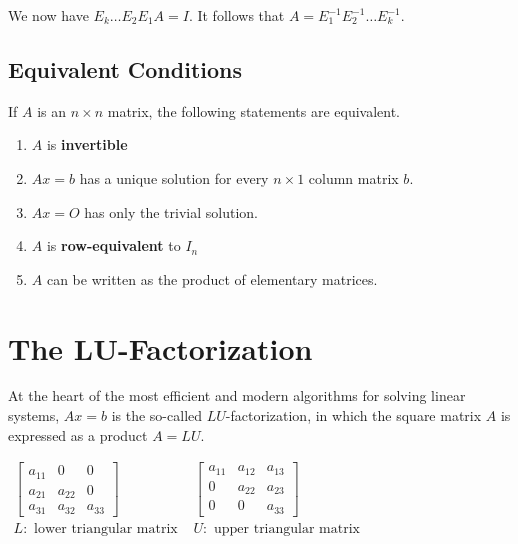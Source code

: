 \documentclass{article}
\newcommand\B{\textbf}
\newcommand\x{\times}
\begin{document}
    We now have $E_k \dots E_2E_1A = I$. It follows that $A = E_1^{-1}E_2^{-1}\dots E_k^{-1}$.

    \subsection*{\textcolor{blue3}{Equivalent Conditions}}

    \begin{center}
    \begin{tcolorbox}
           If $A$ is an $n \x n$ matrix, the following statements are equivalent.
           \begin{enumerate}
               \item $A$ is \B{invertible}
               \item $Ax = b$ has a unique solution for every $n \x 1$ column matrix $b$.
               \item $Ax = O$ has only the trivial solution.
               \item $A$ is \B{row-equivalent} to $I_n$
               \item $A$ can be written as the product of elementary matrices.
           \end{enumerate}
    \end{tcolorbox}
    
    \end{center}

    \section{The LU-Factorization}
    
    At the heart of the most efficient and modern algorithms for solving linear systems,
    $Ax = b$ is the so-called $LU$-factorization, in which the square matrix $A$ is expressed as
    a product $A = LU$.

    $ \begin{array}{cc}
        \begin{bmatrix}
            a_{11} & 0 & 0 \\
            a_{21} & a_{22} & 0 \\
            a_{31} & a_{32} & a_{33}
        \end{bmatrix}
        & \begin{bmatrix}
            a_{11} & a_{12} & a_{13} \\
            0 & a_{22} & a_{23} \\
            0 & 0 & a_{33}
        \end{bmatrix} \\
        L:\text{ lower triangular matrix } & U:\text{ upper triangular matrix }
    \end{array}$
\end{document}

